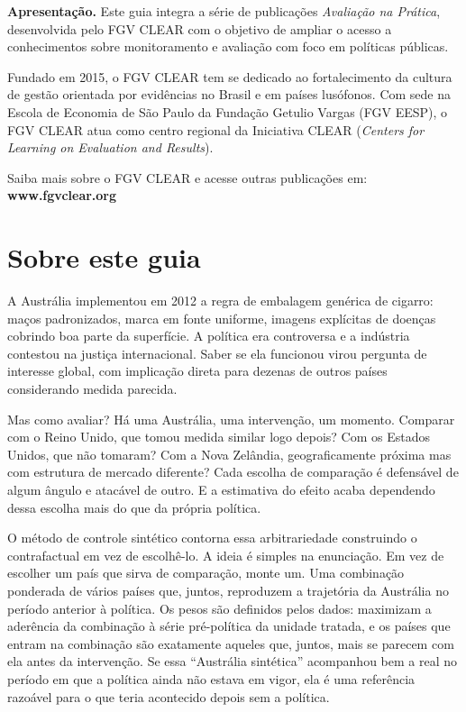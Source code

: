 \documentclass[12pt, a4paper, openany]{book}
\begin{document}
\vspace{1cm}

\noindent\textbf{Apresentação.} Este guia integra a série de publicações \textit{Avaliação na Prática}, desenvolvida pelo FGV CLEAR com o objetivo de ampliar o acesso a conhecimentos sobre monitoramento e avaliação com foco em políticas públicas.

Fundado em 2015, o FGV CLEAR tem se dedicado ao fortalecimento da cultura de gestão orientada por evidências no Brasil e em países lusófonos. Com sede na Escola de Economia de São Paulo da Fundação Getulio Vargas (FGV EESP), o FGV CLEAR atua como centro regional da Iniciativa CLEAR (\textit{Centers for Learning on Evaluation and Results}).

Saiba mais sobre o FGV CLEAR e acesse outras publicações em: \textbf{www.fgvclear.org}
\newpage

\thispagestyle{empty}
\section*{Sobre este guia}
A Austrália implementou em 2012 a regra de embalagem genérica de cigarro:
maços padronizados, marca em fonte uniforme, imagens explícitas de doenças
cobrindo boa parte da superfície. A política era controversa e a indústria
contestou na justiça internacional. Saber se ela funcionou virou pergunta
de interesse global, com implicação direta para dezenas de outros países
considerando medida parecida.

Mas como avaliar? Há uma Austrália, uma intervenção, um momento. Comparar
com o Reino Unido, que tomou medida similar logo depois? Com os Estados
Unidos, que não tomaram? Com a Nova Zelândia, geograficamente próxima mas
com estrutura de mercado diferente? Cada escolha de comparação é
defensável de algum ângulo e atacável de outro. E a estimativa do efeito
acaba dependendo dessa escolha mais do que da própria política.

O método de controle sintético contorna essa arbitrariedade construindo o
contrafactual em vez de escolhê-lo. A ideia é simples na enunciação. Em
vez de escolher um país que sirva de comparação, monte um. Uma combinação
ponderada de vários países que, juntos, reproduzem a trajetória da
Austrália no período anterior à política. Os pesos são definidos pelos
dados: maximizam a aderência da combinação à série pré-política da unidade
tratada, e os países que entram na combinação são exatamente aqueles que,
juntos, mais se parecem com ela antes da intervenção. Se essa
``Austrália sintética'' acompanhou bem a real no período em que a política
ainda não estava em vigor, ela é uma referência razoável para o que teria
acontecido depois sem a política.
\end{document}
